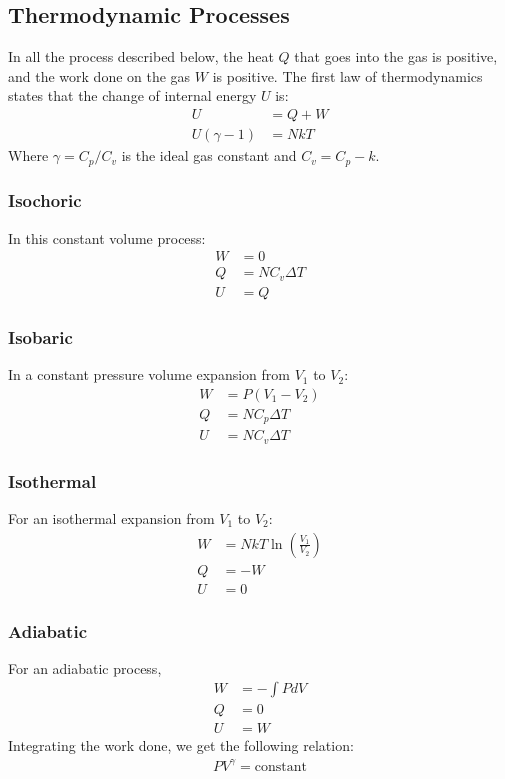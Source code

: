 \documentclass[11pt, letterpaper]{article}
\begin{document}
\begin{multicols*}{3}
\subsection{Thermodynamic Processes}
In all the process described below, the heat $Q$ that goes into the gas is positive, and the work done on the gas $W$ is positive. The first law of thermodynamics states that the change of internal energy $U$ is:
\begin{align*}
  U &= Q + W \\
  U (\gamma - 1) &= NkT
\end{align*}
Where $\gamma = C_p/C_v$ is the ideal gas constant and $C_v = C_p - k$.
\subsubsection{Isochoric}
In this constant volume process:
\begin{align*}
  W &= 0 \\
  Q &= N C_v \Delta T \\
  U &= Q
\end{align*}

\subsubsection{Isobaric}
In a constant pressure volume expansion from $V_1$ to $V_2$:
\begin{align*}
  W &= P(V_1 - V_2) \\
  Q &= N C_p \Delta T \\
  U &= N C_v \Delta T
\end{align*}

\subsubsection{Isothermal}
For an isothermal expansion from $V_1$ to $V_2$:
\begin{align*}
  W &= NkT \ln \left( \frac{V_1}{V_2} \right) \\
  Q &= - W \\
  U &= 0 
\end{align*}

\subsubsection{Adiabatic}
For an adiabatic process,
\begin{align*}
  W &= - \int P dV \\
  Q &= 0 \\
  U &= W
\end{align*}
Integrating the work done, we get the following relation:
\begin{align*}
  PV^{\gamma} = \text{constant}
\end{align*}


\end{multicols*}
\end{document}
